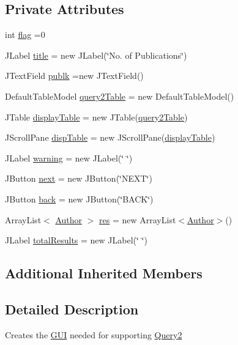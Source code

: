 \subsection*{Private Attributes}
\begin{DoxyCompactItemize}
\item 
int \hyperlink{classGuiQuery2_ac581df0639712a0ef23b6eee49df03e0}{flag} =0
\item 
J\+Label \hyperlink{classGuiQuery2_adb385146a2f0b88b98fa44c95cc4efc5}{title} = new J\+Label(\char`\"{}No. of Publications\char`\"{})
\item 
J\+Text\+Field \hyperlink{classGuiQuery2_aadf0bcfdb4aa2bad406378cf07be0c24}{publk} =new J\+Text\+Field()
\item 
Default\+Table\+Model \hyperlink{classGuiQuery2_a0b3f16b0f92eabbdea82f4abd3ba4377}{query2\+Table} = new Default\+Table\+Model()
\item 
J\+Table \hyperlink{classGuiQuery2_af15c62d5c9199ea2fdf2de7442495c72}{display\+Table} = new J\+Table(\hyperlink{classGuiQuery2_a0b3f16b0f92eabbdea82f4abd3ba4377}{query2\+Table})
\item 
J\+Scroll\+Pane \hyperlink{classGuiQuery2_abba8f10b666db3ea7653c3f6a647fb60}{disp\+Table} = new J\+Scroll\+Pane(\hyperlink{classGuiQuery2_af15c62d5c9199ea2fdf2de7442495c72}{display\+Table})
\item 
J\+Label \hyperlink{classGuiQuery2_ab813118a2db6297717b32f054e5305e9}{warning} = new J\+Label(\char`\"{} \char`\"{})
\item 
J\+Button \hyperlink{classGuiQuery2_a2a63533eaacb408e66da8beb1738b140}{next} = new J\+Button(\char`\"{}N\+E\+XT\char`\"{})
\item 
J\+Button \hyperlink{classGuiQuery2_adb82d5a5b40c916e957bddbca80efb4b}{back} = new J\+Button(\char`\"{}B\+A\+CK\char`\"{})
\item 
Array\+List$<$ \hyperlink{classAuthor}{Author} $>$ \hyperlink{classGuiQuery2_a97d061ff962c9d44c1723bc040c34458}{res} = new Array\+List$<$\hyperlink{classAuthor}{Author}$>$()
\item 
J\+Label \hyperlink{classGuiQuery2_a09768aea9ccb55c5e1d1d9926e2ae048}{total\+Results} = new J\+Label(\char`\"{} \char`\"{})
\end{DoxyCompactItemize}
\subsection*{Additional Inherited Members}


\subsection{Detailed Description}
Creates the \hyperlink{classGUI}{G\+UI} needed for supporting \hyperlink{classQuery2}{Query2} 

